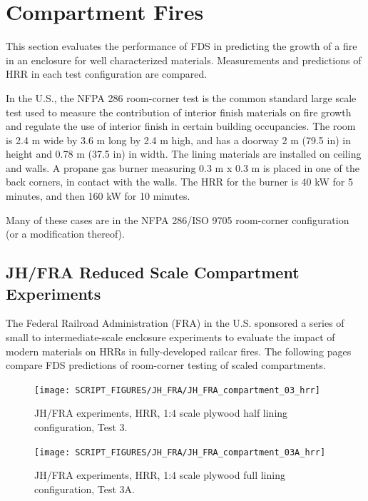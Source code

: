 \section{Compartment Fires}\label{sec_Compartment_Fires}

This section evaluates the performance of FDS in predicting the growth of a fire in an enclosure for well characterized materials.
Measurements and predictions of HRR in each test configuration are compared.

In the U.S., the NFPA 286 room-corner test is the common standard large scale test used to measure the contribution of interior finish materials on fire growth and regulate the use of interior finish in certain building occupancies.
The room is 2.4 m wide by 3.6 m long by 2.4 m high, and has a doorway 2 m (79.5 in) in height and 0.78 m (37.5 in) in width.
The lining materials are installed on ceiling and walls. A propane gas burner measuring 0.3 m x 0.3 m is placed in one of the back corners, in contact with the walls.
The HRR for the burner is 40 kW for 5 minutes, and then 160 kW for 10 minutes.

Many of these cases are in the NFPA 286/ISO 9705 room-corner configuration (or a modification thereof).

\subsection{JH/FRA Reduced Scale Compartment Experiments}\label{sec_JH_FRA_Scaled_Compartments}

The Federal Railroad Administration (FRA) in the U.S. sponsored a series of small to intermediate-scale enclosure experiments to evaluate the impact of modern materials on HRRs in fully-developed railcar fires.
The following pages compare FDS predictions of room-corner testing of scaled compartments.

\begin{figure}[h!]
\centering
\texttt{[image: SCRIPT\_FIGURES/JH\_FRA/JH\_FRA\_compartment\_03\_hrr]}
\caption[JH/FRA experiments, HRR, 1:4 scale plywood half lining configuration, Test 3]{JH/FRA experiments, HRR, 1:4 scale plywood half lining configuration, Test 3.}
\label{JH_FRA_plywood_01}
\end{figure}

\begin{figure}[h!]
\centering
\texttt{[image: SCRIPT\_FIGURES/JH\_FRA/JH\_FRA\_compartment\_03A\_hrr]}
\caption[JH/FRA experiments, HRR, 1:4 scale plywood full lining configuration, Test 3A]{JH/FRA experiments, HRR, 1:4 scale plywood full lining configuration, Test 3A.}
\label{JH_FRA_plywood_01A}
\end{figure}

